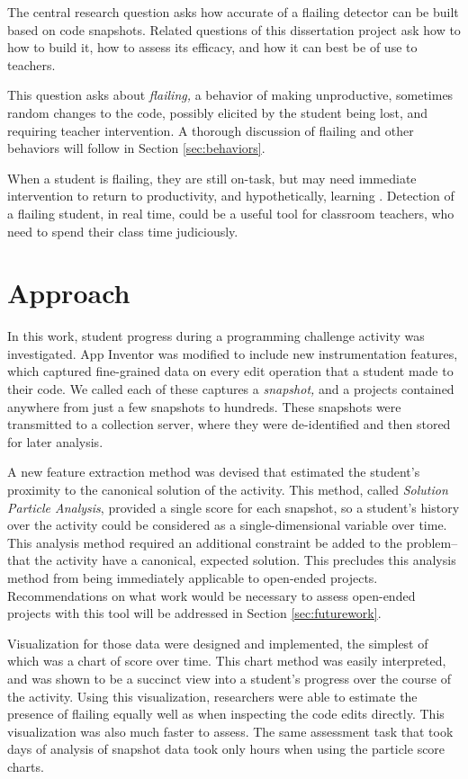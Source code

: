 The central research question asks how accurate of a flailing detector can be built based on code snapshots. Related questions of this dissertation project ask how to how to build it, how to assess its efficacy, and how it can best be of use to teachers.

This question asks about \emph{flailing,} a behavior of making unproductive, sometimes random changes to the code, possibly elicited by the student being lost, and requiring teacher intervention. A thorough discussion of flailing and other behaviors will follow in Section \ref{sec:behaviors}.

When a student is flailing, they are still on-task, but may need immediate intervention to return to productivity, and hypothetically, learning \citep{baker2004off, perkins-1986}. Detection of a flailing student, in real time, could be a useful tool for classroom teachers, who need to spend their class time judiciously. 



\section{Approach}
In this work, student progress during a programming challenge activity was investigated. App Inventor was modified to include new instrumentation features, which captured fine-grained data on every edit operation that a student made to their code. We called each of these captures a \emph{snapshot,} and a projects contained anywhere from just a few snapshots to hundreds. These snapshots were transmitted to a collection server, where they were de-identified and then stored for later analysis.

A new feature extraction method was devised that estimated the student's proximity to the canonical solution of the activity. This method, called \emph{Solution Particle Analysis}, provided a single score for each snapshot, so a student's history over the activity could be considered as a single-dimensional variable over time. This analysis method required an additional constraint be added to the problem-- that the activity have a canonical, expected solution. This precludes this analysis method from being immediately applicable to open-ended projects. Recommendations on what work would be necessary to assess open-ended projects with this tool will be addressed in Section \ref{sec:futurework}.

Visualization for those data were designed and implemented, the simplest of which was a chart of score over time. This chart method was easily interpreted, and was shown to be a succinct view into a student's progress over the course of the activity. Using this visualization, researchers were able to estimate the presence of flailing equally well as when inspecting the code edits directly. This visualization was also much faster to assess. The same assessment task that took days of analysis of snapshot data took only hours when using the particle score charts.

